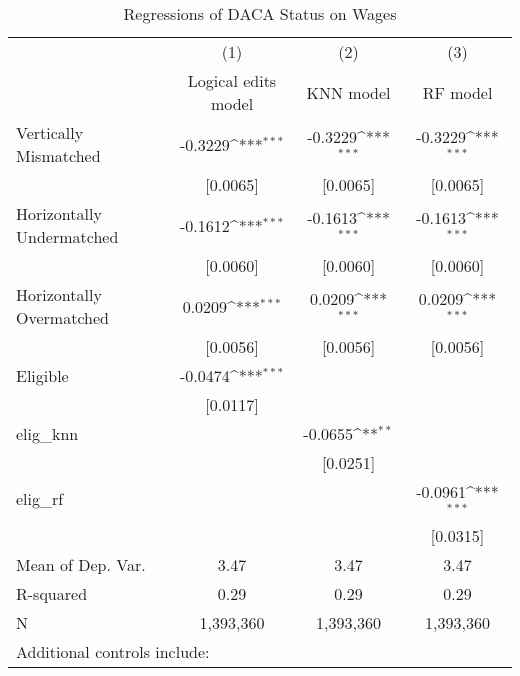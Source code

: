 \begin{table}[htbp]\centering
\def\sym#1{\ifmmode^{#1}\else\(^{#1}\)\fi}
\caption{Regressions of DACA Status on Wages}
\begin{tabular}{l*{3}{c}}
\toprule
                    &\multicolumn{1}{c}{(1)}         &\multicolumn{1}{c}{(2)}         &\multicolumn{1}{c}{(3)}         \\
                    &Logical edits model         &   KNN model         &    RF model         \\
\midrule
Vertically Mismatched&     -0.3229\sym{***}&     -0.3229\sym{***}&     -0.3229\sym{***}\\
                    &    [0.0065]         &    [0.0065]         &    [0.0065]         \\
\addlinespace
Horizontally Undermatched&     -0.1612\sym{***}&     -0.1613\sym{***}&     -0.1613\sym{***}\\
                    &    [0.0060]         &    [0.0060]         &    [0.0060]         \\
\addlinespace
Horizontally Overmatched&      0.0209\sym{***}&      0.0209\sym{***}&      0.0209\sym{***}\\
                    &    [0.0056]         &    [0.0056]         &    [0.0056]         \\
\addlinespace
Eligible            &     -0.0474\sym{***}&                     &                     \\
                    &    [0.0117]         &                     &                     \\
\addlinespace
elig\_knn            &                     &     -0.0655\sym{**} &                     \\
                    &                     &    [0.0251]         &                     \\
\addlinespace
elig\_rf             &                     &                     &     -0.0961\sym{***}\\
                    &                     &                     &    [0.0315]         \\
\midrule
Mean of Dep. Var.   &        3.47         &        3.47         &        3.47         \\
R-squared           &        0.29         &        0.29         &        0.29         \\
N                   &   1,393,360         &   1,393,360         &   1,393,360         \\
\bottomrule
\multicolumn{4}{l}{\footnotesize Additional controls include:}\\

\end{tabular}
\end{table}
